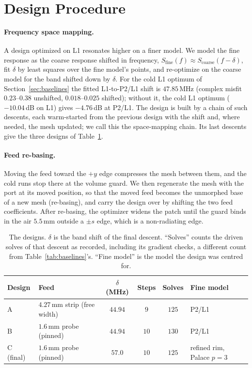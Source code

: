 \documentclass{anvil-paper}
\newcommand{\PL}{P2/L1}
\begin{document}
\section{Design Procedure}
\label{sec:procedure}

\paragraph{Frequency space mapping.}
A design optimized on L1 resonates higher on a finer model. We model the
fine response as the coarse response shifted in frequency,
$S_{\mathrm{fine}}(f) \approx S_{\mathrm{coarse}}(f - \delta)$, fit $\delta$
by least squares over the fine model's points, and re-optimize on the coarse
model for the band shifted down by $\delta$. For the cold L1 optimum of
Section~\ref{sec:baselines} the fitted L1-to-\PL{} shift is $47.85$\,MHz
(complex misfit $0.23$--$0.38$ unshifted, $0.018$--$0.025$ shifted); without
it, the cold L1 optimum ($-10.04$\,dB on L1) gives $-4.76$\,dB at \PL.
The design is built by a chain of such descents, each warm-started from the
previous design with the shift and, where needed, the mesh updated; we call
this the space-mapping chain. Its last descents give the three designs of
Table~\ref{tab:chain}.

\paragraph{Feed re-basing.}
Moving the feed toward the $+y$ edge compresses the mesh between them, and
the cold runs stop there at the volume guard. We then regenerate the mesh
with the port at its moved position, so that the moved feed becomes the
unmorphed base of a new mesh (re-basing), and carry the design over by
shifting the two feed coefficients. After re-basing, the optimizer widens the patch
until the guard binds in the air $5.5$\,mm outside a $\pm s$ edge, which is
a non-radiating edge.

\begin{table}[t]
  \centering
  \caption{The designs. $\delta$ is the band shift of the final descent.
  ``Solves'' counts the driven solves of that descent as recorded,
  including its gradient checks, a different count from
  Table~\ref{tab:baselines}'s. ``Fine model'' is the model the design was
  centred for.}
  \label{tab:chain}
  \small
  \begin{tabular}{@{}l l c c c l@{}}
    \toprule
    Design & Feed & $\delta$ (MHz) & Steps & Solves & Fine model \\
    \midrule
    A & $4.27$\,mm strip (free width) & $44.94$ & $9$ & $125$ & \PL \\
    B & $1.6$\,mm probe (pinned) & $44.94$ & $10$ & $130$ & \PL \\
    C (final) & $1.6$\,mm probe (pinned) & $57.0$ & $10$ & $125$ & refined rim, Palace $p = 3$ \\
    \bottomrule
  \end{tabular}
\end{table}
\end{document}
